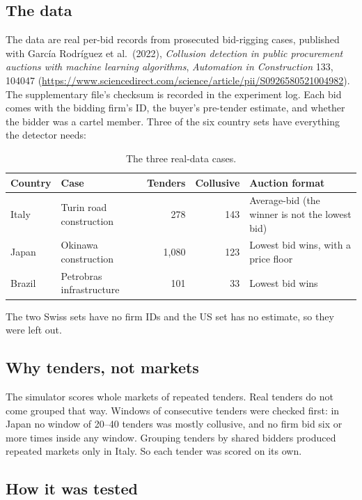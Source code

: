 \documentclass[11pt,a4paper]{article}
\begin{document}
\subsection{The data}

The data are real per-bid records from prosecuted bid-rigging cases, published with García Rodríguez et al.\ (2022), \emph{Collusion detection in public procurement auctions with machine learning algorithms}, \emph{Automation in Construction} 133, 104047 (\url{https://www.sciencedirect.com/science/article/pii/S0926580521004982}). The supplementary file's checksum is recorded in the experiment log. Each bid comes with the bidding firm's ID, the buyer's pre-tender estimate, and whether the bidder was a cartel member. Three of the six country sets have everything the detector needs:

\begin{table}[H]
\centering
\small
\begin{tabular}{@{}llrrp{5.2cm}@{}}
\toprule
Country & Case & Tenders & Collusive & Auction format \\
\midrule
Italy & Turin road construction & 278 & 143 & Average-bid (the winner is not the lowest bid) \\
Japan & Okinawa construction & 1{,}080 & 123 & Lowest bid wins, with a price floor \\
Brazil & Petrobras infrastructure & 101 & 33 & Lowest bid wins \\
\bottomrule
\end{tabular}
\caption{The three real-data cases.}
\end{table}

The two Swiss sets have no firm IDs and the US set has no estimate, so they were left out.

\subsection{Why tenders, not markets}

The simulator scores whole markets of repeated tenders. Real tenders do not come grouped that way. Windows of consecutive tenders were checked first: in Japan no window of 20--40 tenders was mostly collusive, and no firm bid six or more times inside any window. Grouping tenders by shared bidders produced repeated markets only in Italy. So each tender was scored on its own.

\subsection{How it was tested}
\end{document}
